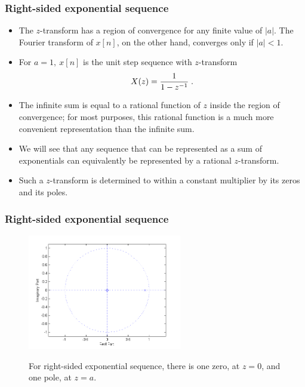 \begin{frame}
\frametitle{Right-sided exponential sequence}
\begin{itemize}
\item The $z$-transform has a region of convergence for any finite value of $|a|$. The Fourier transform of $x[n]$, on the other hand, converges only if $|a|<1$.
\item For $a=1,\ x[n]$ is the unit step sequence with $z$-transform
$$
X(z)=\frac{1}{1-z^{-1}} \;.
$$

\item The infinite sum is equal to a rational function of $z$ inside the region of convergence; for most purposes, this rational function is a much more convenient representation than the infinite sum. 
\item We will see that any sequence that can be represented as a sum of exponentials can equivalently be represented by a rational $z$-transform.
\item Such a $z$-transform is determined to within a constant multiplier by its \alert{zeros} and its \alert{poles}. 
\end{itemize}
\end{frame}



\begin{frame}
\frametitle{Right-sided exponential sequence}
\begin{figure}
  \centering
  \includegraphics[width=0.6\textwidth]{polezeroonesided.png}\\
  \caption{For right-sided exponential sequence, there is one zero, at $z=0$, and one pole, at $z=a$.}
\end{figure}
\end{frame}

